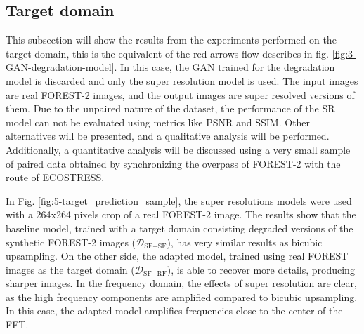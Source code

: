     \pagebreak

        
            
    
    \subsection{Target domain}

        This subsection will show the results from the experiments performed on the target domain, this is the equivalent of the red arrows flow describes in fig. \ref{fig:3-GAN-degradation-model}.
        In this case, the GAN trained for the degradation model is discarded and only the super resolution model is used.
        The input images are real FOREST-2 images, and the output images are super resolved versions of them. 
        Due to the unpaired nature of the dataset, the performance of the SR model can not be evaluated using metrics like PSNR and SSIM. 
        Other alternatives will be presented, and a qualitative analysis will be performed. 
        Additionally, a quantitative analysis will be discussed using a very small sample of paired data obtained by synchronizing the overpass of FOREST-2 with the route of ECOSTRESS.


        In Fig. \ref{fig:5-target_prediction_sample}, the super resolutions models were used with a 264x264 pixels crop of a real FOREST-2 image.
        The results show that the baseline model, trained with a target domain consisting degraded versions of the synthetic FOREST-2 images ($\mathcal{D}_{\text{SF}-\text{SF}}$), has very similar results as bicubic upsampling.
        On the other side, the adapted model, trained using real FOREST images as the target domain ($\mathcal{D}_{\text{SF}-\text{RF}}$), is able to recover more details, producing sharper images.
        In the frequency domain, the effects of super resolution are clear, as the high frequency components are amplified compared to bicubic upsampling. 
        In this case, the adapted model amplifies frequencies close to the center of the FFT.
        
        


